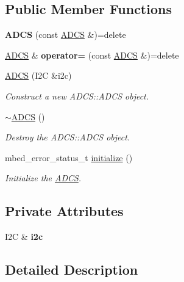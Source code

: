 \subsection*{Public Member Functions}
\begin{DoxyCompactItemize}
\item 
\mbox{\label{class_a_d_c_s_ae19621431053c4e7a4e17e57dc3dbae9}} 
{\bfseries A\+D\+CS} (const \mbox{\hyperlink{class_a_d_c_s}{A\+D\+CS}} \&)=delete
\item 
\mbox{\label{class_a_d_c_s_ae65c7332f0f24d24b251fe3e5a537bbe}} 
\mbox{\hyperlink{class_a_d_c_s}{A\+D\+CS}} \& {\bfseries operator=} (const \mbox{\hyperlink{class_a_d_c_s}{A\+D\+CS}} \&)=delete
\item 
\mbox{\hyperlink{class_a_d_c_s_ac25de50b23a20e173b0e4ea0d7df7f04}{A\+D\+CS}} (I2C \&i2c)
\begin{DoxyCompactList}\small\item\em Construct a new A\+D\+C\+S\+::\+A\+D\+CS object. \end{DoxyCompactList}\item 
\mbox{\hyperlink{class_a_d_c_s_a64926eda19fc2e58876c62616ab0b068}{$\sim$\+A\+D\+CS}} ()
\begin{DoxyCompactList}\small\item\em Destroy the A\+D\+C\+S\+::\+A\+D\+CS object. \end{DoxyCompactList}\item 
mbed\+\_\+error\+\_\+status\+\_\+t \mbox{\hyperlink{class_a_d_c_s_a5a4196a5298a2e804ee85f2965b31133}{initialize}} ()
\begin{DoxyCompactList}\small\item\em Initialize the \mbox{\hyperlink{class_a_d_c_s}{A\+D\+CS}}. \end{DoxyCompactList}\end{DoxyCompactItemize}
\subsection*{Private Attributes}
\begin{DoxyCompactItemize}
\item 
\mbox{\label{class_a_d_c_s_a0d0c83d8adc0c4b68de935cba703e6e7}} 
I2C \& {\bfseries i2c}
\end{DoxyCompactItemize}


\subsection{Detailed Description}


